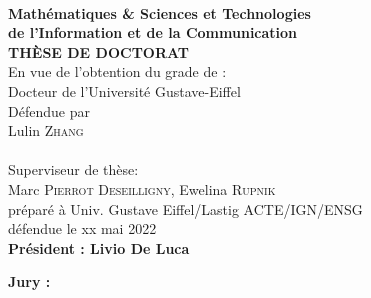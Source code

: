 \begin{titlepage}
\begin{center}
	
\vspace*{0.3cm}
 \\
\noindent \textbf{Math{\'e}matiques \& Sciences et Technologies\\de l’Information et de la Communication} \\
\vspace*{0.5cm}
\noindent \Huge \textbf{THÈSE DE DOCTORAT} \\
\vspace*{0.3cm}
\noindent \large {En vue de l’obtention du grade de :} \\
\vspace*{0.3cm}
\noindent \Large Docteur de l'Université Gustave-Eiffel\\
\vspace*{0.4cm}
\noindent \large {Défendue par\\}
\noindent \huge Lulin \textsc{Zhang} \\
\vspace*{0.8cm}
 \\
\vspace*{0.8cm}
\noindent \Large Superviseur de thèse: \\
Marc \textsc{Pierrot Deseilligny}, Ewelina \textsc{Rupnik}\\
\vspace*{0.2cm}
\noindent \Large préparé à Univ. Gustave Eiffel/Lastig ACTE/IGN/ENSG\\
\vspace*{0.2cm}
\noindent \large défendue le xx mai 2022 \\
\vspace*{0.5cm}
\noindent \large \textbf{Président : Livio De Luca}
\end{center}
\noindent \large \textbf{Jury :} \\
\begin{center}

\end{center}
\end{titlepage}
